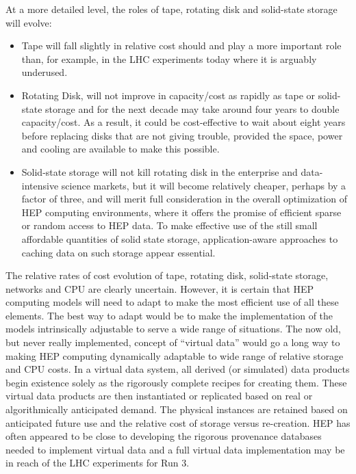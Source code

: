 At a more detailed level, the roles of tape, rotating disk and solid-state 
storage will evolve:
\begin{itemize}
\item
Tape will fall slightly in relative cost should and play a more important role 
than, for example, in the LHC experiments today where it is arguably underused.
\item
Rotating Disk, will not improve in capacity/cost as rapidly as tape or solid-state 
storage and for the next decade may take around four years to double capacity/cost.  
As a result, it could be cost-effective to wait about eight years before replacing 
disks that are not giving trouble, provided the space, power and cooling are available to make this possible.
\item
Solid-state storage will not kill rotating disk in the enterprise and data-intensive 
science markets, but it will become relatively cheaper, perhaps by a factor of three, 
and will merit full consideration in the overall optimization of HEP computing 
environments, where it offers the promise of efficient sparse or random access 
to HEP data.  To make effective use of the still small affordable quantities of 
solid state storage, application-aware approaches to caching data on such storage 
appear essential.
\end{itemize}

The relative rates of cost evolution of tape, rotating disk, solid-state storage, 
networks and CPU are clearly uncertain.  However, it is certain that HEP computing
models will need to adapt to make the most efficient use of all these elements.  
The best way to adapt would be to make the implementation of the models 
intrinsically adjustable to serve a wide range of situations. The now old, 
but never really implemented, concept of ``virtual data'' would go a long way to 
making HEP computing dynamically adaptable to wide range of relative storage and 
CPU costs.  In a virtual data system, all derived (or simulated) data products 
begin existence solely as the rigorously complete recipes for creating them.  
These virtual data products are then instantiated or replicated based on real 
or algorithmically anticipated demand.  The physical instances are retained 
based on anticipated future use and the relative cost of storage versus re-creation.  
HEP has often appeared to be close to developing the rigorous provenance databases 
needed to implement virtual data and a full virtual data implementation may be in 
reach of the LHC experiments for Run 3. 

